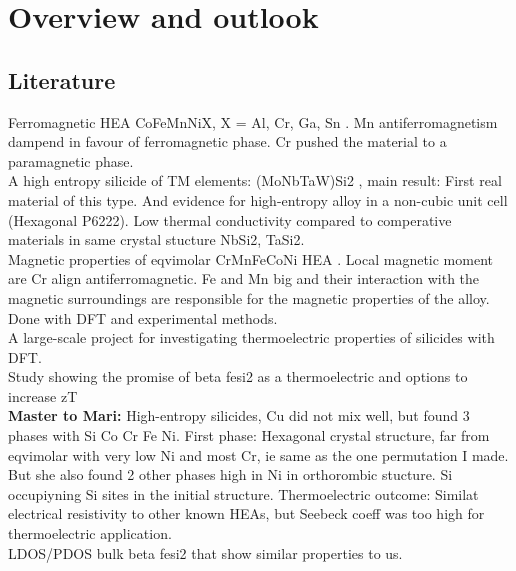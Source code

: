 \chapter{Overview and outlook}
\label{sec:overview}


\section{Literature}

Ferromagnetic HEA CoFeMnNiX, X = Al, Cr, Ga, Sn	\cite{ZUO201710}. Mn antiferromagnetism dampend in favour of ferromagnetic phase. Cr pushed the material to a paramagnetic phase. \\

A high entropy silicide  of TM elements: (MoNbTaW)Si2 \cite{GILD2019337}, main result: First real material of this type. And evidence for high-entropy alloy in a non-cubic unit cell (Hexagonal P6222). Low thermal conductivity compared to comperative materials in same crystal stucture NbSi2, TaSi2.  \\

Magnetic properties of eqvimolar CrMnFeCoNi HEA \cite{PhysRevB.96.014437}. Local magnetic moment are Cr align antiferromagnetic. Fe and Mn big and their interaction with the magnetic surroundings are responsible for the magnetic properties of the alloy. Done with DFT and experimental methods. \\

A large-scale project for investigating thermoelectric properties of silicides \cite{doi:10.1063/5.0008198} with DFT. \\

Study showing the promise of beta fesi2 as a thermoelectric and options to increase zT \cite{doi:10.1021/acsami.0c00321} \\

\textbf{Master to Mari:} High-entropy silicides, Cu did not mix well, but found 3 phases with Si Co Cr Fe Ni. First phase: Hexagonal crystal structure, far from eqvimolar with very low Ni and most Cr, ie same as the one permutation I made. But she also found 2 other phases high in Ni in orthorombic stucture. Si occupiyning Si sites in the initial structure. Thermoelectric outcome: Similat electrical resistivity to other known HEAs, but Seebeck coeff was too high for thermoelectric application. \\

LDOS/PDOS bulk beta fesi2 \cite{doi:10.1063/1.346415} that show similar properties to us. \\

